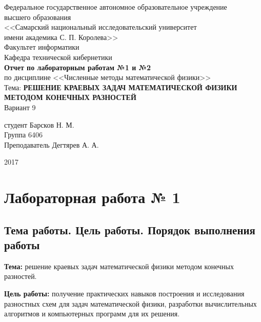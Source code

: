 \documentclass[a4paper,12pt,russian, fleqn]{extreport}
\begin{document}
	\begin{center}
		Федеральное государственное автономное образовательное учреждение \\
		высшего образования \\
		<<Самарский национальный исследовательский университет \\
		имени академика С. П. Королева>>\\
		\vspace{2cm}
		Факультет информатики \\
		\vspace{1cm}
		Кафедра технической кибернетики \\
		\vspace{3cm}
		\textbf{Отчет по лабораторным работам №1 и №2} \\
		по дисциплине <<Численные методы математической физики>> \\
		\vspace{1cm}
		Тема: \textbf{РЕШЕНИЕ КРАЕВЫХ ЗАДАЧ МАТЕМАТИЧЕСКОЙ ФИЗИКИ МЕТОДОМ КОНЕЧНЫХ РАЗНОСТЕЙ}\\
		\vspace{1cm}
		Вариант 9
	\end{center}

	 студент Барсков Н. М. \\
	Группа 6406\\
	Преподаватель Дегтярев А. А.
	\vfill
	\begin{center}
		2017
	\end{center}
	\newpage
	
	\tableofcontents
	
	\chapter{Лабораторная работа № 1}
	\section{Тема работы. Цель работы. Порядок выполнения работы}
	\textbf{Тема:} решение краевых задач математической физики методом конечных разностей.
	
	\textbf{Цель работы:} получение практических навыков построения и исследования разностных схем для задач математической физики, разработки вычислительных алгоритмов и компьютерных программ для их решения.
	
\end{document}
